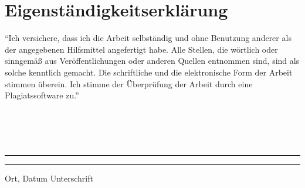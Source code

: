 \documentclass[12pt, a4paper, oneside]{article}
\begin{document}
\newpage

\section{Eigenständigkeitserklärung}
``Ich versichere, dass ich die Arbeit selbständig und ohne Benutzung anderer als der angegebenen Hilfsmittel angefertigt habe. Alle Stellen, die wörtlich oder sinngemäß aus Veröffentlichungen oder anderen Quellen entnommen sind, sind als solche kenntlich gemacht. Die schriftliche und die elektronische Form der Arbeit stimmen überein. Ich stimme der Überprüfung der Arbeit durch eine Plagiatssoftware zu.''
\paragraph{}$~~$\\
\paragraph{}$~~$\\
\vspace{50pt} 
\noindent\rule{5cm}{.4pt}\hfill\rule{5cm}{.4pt}\par 
\noindent Ort, Datum \hfill Unterschrift 
\end{document}

